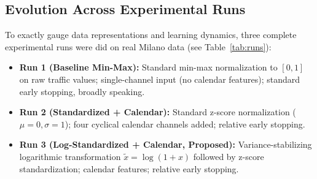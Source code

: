 \documentclass[conference]{IEEEtran}
\begin{document}
\subsection{Evolution Across Experimental Runs}
To exactly gauge data representations and learning dynamics, three complete experimental runs were did on real Milano data (see Table~\ref{tab:runs}):
\begin{itemize}
    \item \textbf{Run 1 (Baseline Min-Max):} Standard min-max normalization to $[0, 1]$ on raw traffic values; single-channel input (no calendar features); standard early stopping, broadly speaking.
    \item \textbf{Run 2 (Standardized + Calendar):} Standard z-score normalization ($\mu = 0, \sigma = 1$); four cyclical calendar channels added; relative early stopping.
    \item \textbf{Run 3 (Log-Standardized + Calendar, Proposed):} Variance-stabilizing logarithmic transformation $\tilde{x} = \log(1 + x)$ followed by z-score standardization; calendar features; relative early stopping.
\end{itemize}

\begin{table}[htbp]
\caption{System Configurations Across the Three Experimental Runs}
\begin{center}
\label{tab:runs}
\end{center}
\end{table}
\end{document}
